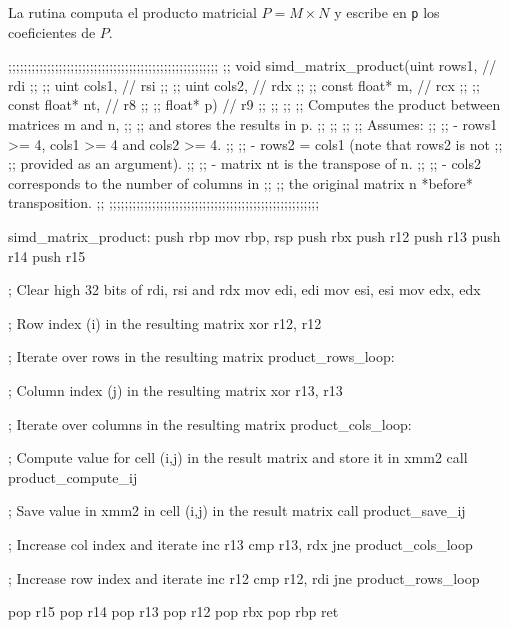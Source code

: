 \documentclass[a4paper, 10pt, twoside]{article}
\newcommand{\cc}[1]{\texttt{#1}}
\begin{document}
La rutina computa el producto matricial $P = M \times N$ y escribe en \cc{p}
los coeficientes de $P$.

\begin{code}
  ;;;;;;;;;;;;;;;;;;;;;;;;;;;;;;;;;;;;;;;;;;;;;;;;;;;;;;
  ;; void simd_matrix_product(uint rows1,      // rdi ;;
  ;;                          uint cols1,      // rsi ;;
  ;;                          uint cols2,      // rdx ;;
  ;;                          const float* m,  // rcx ;;
  ;;                          const float* nt, // r8  ;;
  ;;                          float* p)        // r9  ;;
  ;;                                                  ;;
  ;; Computes the product between matrices m and n,   ;;
  ;; and stores the results in p.                     ;;
  ;;                                                  ;;
  ;; Assumes:                                         ;;
  ;;  - rows1 >= 4, cols1 >= 4 and cols2 >= 4.        ;;
  ;;  - rows2 = cols1 (note that rows2 is not         ;;
  ;;    provided as an argument).                     ;;
  ;;  - matrix nt is the transpose of n.              ;;
  ;;  - cols2 corresponds to the number of columns in ;;
  ;;    the original matrix n *before* transposition. ;;
  ;;;;;;;;;;;;;;;;;;;;;;;;;;;;;;;;;;;;;;;;;;;;;;;;;;;;;;

  simd_matrix_product:
    push rbp
    mov rbp, rsp
    push rbx
    push r12
    push r13
    push r14
    push r15

    ; Clear high 32 bits of rdi, rsi and rdx
    mov edi, edi
    mov esi, esi
    mov edx, edx

    ; Row index (i) in the resulting matrix
    xor r12, r12

    ; Iterate over rows in the resulting matrix
  product_rows_loop:

    ; Column index (j) in the resulting matrix
    xor r13, r13

    ; Iterate over columns in the resulting matrix
  product_cols_loop:

    ; Compute value for cell (i,j) in the result matrix and store it in xmm2
    call product_compute_ij

    ; Save value in xmm2 in cell (i,j) in the result matrix
    call product_save_ij

    ; Increase col index and iterate
    inc r13
    cmp r13, rdx
    jne product_cols_loop

    ; Increase row index and iterate
    inc r12
    cmp r12, rdi
    jne product_rows_loop

    pop r15
    pop r14
    pop r13
    pop r12
    pop rbx
    pop rbp
    ret
\end{code}
\end{document}
